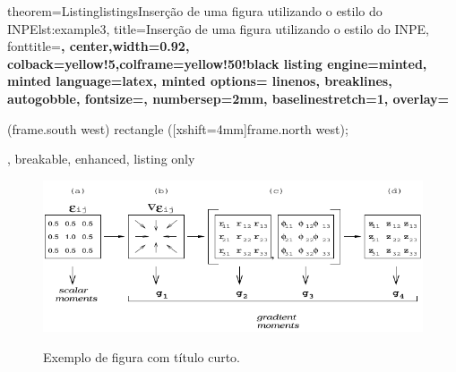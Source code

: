 \documentclass[10pt]{beamer}
\begin{document}
\begin{frame}{}
    \begin{tcblisting}{
        theorem={Listing}{listings}{Inserção de uma figura utilizando o estilo do INPE}{lst:example3},
        title=Inserção de uma figura utilizando o estilo do INPE,
        fonttitle=\small\bfseries,
        center,width=0.92\paperwidth,
        colback=yellow!5,colframe=yellow!50!black
        listing engine=minted,
        minted language=latex,
        minted options={%
            linenos,
            breaklines,
            autogobble,
            fontsize=\small,
            numbersep=2mm,
            baselinestretch=1},
        overlay={%
        \begin{tcbclipinterior}
            \fill[gray!25] (frame.south west) rectangle ([xshift=4mm]frame.north west);
        \end{tcbclipinterior}},
        breakable, enhanced, listing only}
        \begin{figure}[H]
          \caption{Exemplo de figura com título curto.}
          \vspace{6mm} %
          \begin{center}
            \includegraphics[width=12cm]{./figs/gpa.pdf}  
          \end{center}
          \vspace{4mm} %
          \label{figgpa1}
        \end{figure}
    \end{tcblisting}
\end{frame}
\end{document}
